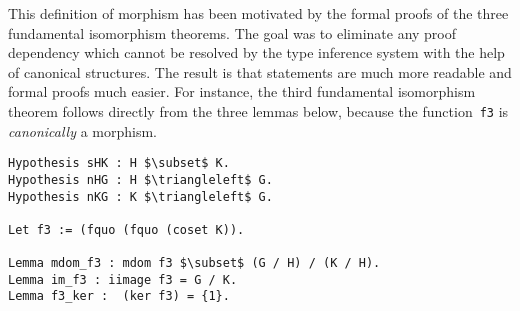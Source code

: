 This definition of morphism has been motivated by the formal proofs of the
three fundamental isomorphism theorems. The goal was to eliminate
any proof dependency which cannot be resolved by the type inference system with the help
of canonical structures. The result is that statements are much more readable
and formal proofs much easier.
For instance, the third fundamental isomorphism theorem follows directly
from the three lemmas below, because the
function~\lstinline[basicstyle=\footnotesize]+f3+ is \emph{canonically}
a morphism.

\begin{lstlisting}
Hypothesis sHK : H $\subset$ K.
Hypothesis nHG : H $\triangleleft$ G.
Hypothesis nKG : K $\triangleleft$ G.

Let f3 := (fquo (fquo (coset K)).

Lemma mdom_f3 : mdom f3 $\subset$ (G / H) / (K / H).
Lemma im_f3 : iimage f3 = G / K.
Lemma f3_ker :  (ker f3) = {1}.
\end{lstlisting}
